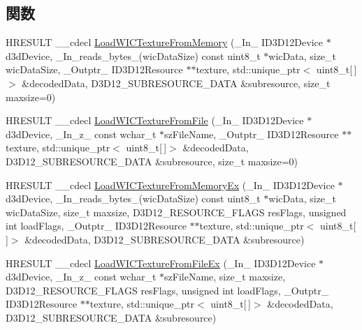 \subsection*{関数}
\begin{DoxyCompactItemize}
\item 
H\+R\+E\+S\+U\+LT \+\_\+\+\_\+cdecl \mbox{\hyperlink{namespace_direct_x_a8f576b66bd7c5e3642f7b9dac0755504}{Load\+W\+I\+C\+Texture\+From\+Memory}} (\+\_\+\+In\+\_\+ I\+D3\+D12\+Device $\ast$d3d\+Device, \+\_\+\+In\+\_\+reads\+\_\+bytes\+\_\+(wic\+Data\+Size) const uint8\+\_\+t $\ast$wic\+Data, size\+\_\+t wic\+Data\+Size, \+\_\+\+Outptr\+\_\+ I\+D3\+D12\+Resource $\ast$$\ast$texture, std\+::unique\+\_\+ptr$<$ uint8\+\_\+t\mbox{[}$\,$\mbox{]}$>$ \&decoded\+Data, D3\+D12\+\_\+\+S\+U\+B\+R\+E\+S\+O\+U\+R\+C\+E\+\_\+\+D\+A\+TA \&subresource, size\+\_\+t maxsize=0)
\item 
H\+R\+E\+S\+U\+LT \+\_\+\+\_\+cdecl \mbox{\hyperlink{namespace_direct_x_a0b17693fe5dbc2fd7a45394d0723cb8b}{Load\+W\+I\+C\+Texture\+From\+File}} (\+\_\+\+In\+\_\+ I\+D3\+D12\+Device $\ast$d3d\+Device, \+\_\+\+In\+\_\+z\+\_\+ const wchar\+\_\+t $\ast$sz\+File\+Name, \+\_\+\+Outptr\+\_\+ I\+D3\+D12\+Resource $\ast$$\ast$texture, std\+::unique\+\_\+ptr$<$ uint8\+\_\+t\mbox{[}$\,$\mbox{]}$>$ \&decoded\+Data, D3\+D12\+\_\+\+S\+U\+B\+R\+E\+S\+O\+U\+R\+C\+E\+\_\+\+D\+A\+TA \&subresource, size\+\_\+t maxsize=0)
\item 
H\+R\+E\+S\+U\+LT \+\_\+\+\_\+cdecl \mbox{\hyperlink{namespace_direct_x_a0578d4a2b59a0e7cccada5b0337d7abe}{Load\+W\+I\+C\+Texture\+From\+Memory\+Ex}} (\+\_\+\+In\+\_\+ I\+D3\+D12\+Device $\ast$d3d\+Device, \+\_\+\+In\+\_\+reads\+\_\+bytes\+\_\+(wic\+Data\+Size) const uint8\+\_\+t $\ast$wic\+Data, size\+\_\+t wic\+Data\+Size, size\+\_\+t maxsize, D3\+D12\+\_\+\+R\+E\+S\+O\+U\+R\+C\+E\+\_\+\+F\+L\+A\+GS res\+Flags, unsigned int load\+Flags, \+\_\+\+Outptr\+\_\+ I\+D3\+D12\+Resource $\ast$$\ast$texture, std\+::unique\+\_\+ptr$<$ uint8\+\_\+t\mbox{[}$\,$\mbox{]}$>$ \&decoded\+Data, D3\+D12\+\_\+\+S\+U\+B\+R\+E\+S\+O\+U\+R\+C\+E\+\_\+\+D\+A\+TA \&subresource)
\item 
H\+R\+E\+S\+U\+LT \+\_\+\+\_\+cdecl \mbox{\hyperlink{namespace_direct_x_a0a225c0e4dd4c907211fe54ca6ae1765}{Load\+W\+I\+C\+Texture\+From\+File\+Ex}} (\+\_\+\+In\+\_\+ I\+D3\+D12\+Device $\ast$d3d\+Device, \+\_\+\+In\+\_\+z\+\_\+ const wchar\+\_\+t $\ast$sz\+File\+Name, size\+\_\+t maxsize, D3\+D12\+\_\+\+R\+E\+S\+O\+U\+R\+C\+E\+\_\+\+F\+L\+A\+GS res\+Flags, unsigned int load\+Flags, \+\_\+\+Outptr\+\_\+ I\+D3\+D12\+Resource $\ast$$\ast$texture, std\+::unique\+\_\+ptr$<$ uint8\+\_\+t\mbox{[}$\,$\mbox{]}$>$ \&decoded\+Data, D3\+D12\+\_\+\+S\+U\+B\+R\+E\+S\+O\+U\+R\+C\+E\+\_\+\+D\+A\+TA \&subresource)
\end{DoxyCompactItemize}



